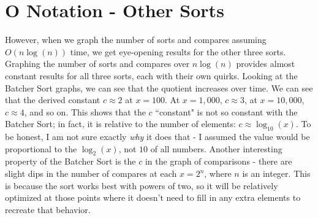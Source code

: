 \documentclass[12pt]{article}
\begin{document}
\section{O Notation - Other Sorts}
However, when we graph the number of sorts and compares assuming $O(n\log(n))$ time, we get eye-opening results for the other three sorts. Graphing the number of sorts and compares over $n\log(n)$ provides almost constant results for all three sorts, each with their own quirks. Looking at the Batcher Sort graphs, we can see that the quotient increases over time. We can see that the derived constant $c \approx 2$ at $x = 100$. At $x = 1,000$, $c \approx 3$, at $x = 10,000$, $c \approx 4$, and so on. This shows that the $c$ ``constant" is not so constant with the Batcher Sort; in fact, it is relative to the number of elements: $c \approx \log_{10}(x)$. To be honest, I am not sure exactly \textit{why} it does that - I assumed the value would be proportional to the $\log_2(x)$, not $10$ of all numbers. Another interesting property of the Batcher Sort is the $c$ in the graph of comparisons - there are slight dips in the number of compares at each $x = 2^n$, where $n$ is an integer. This is because the sort works best with powers of two, so it will be relatively optimized at those points where it doesn't need to fill in any extra elements to recreate that behavior.
\end{document}
